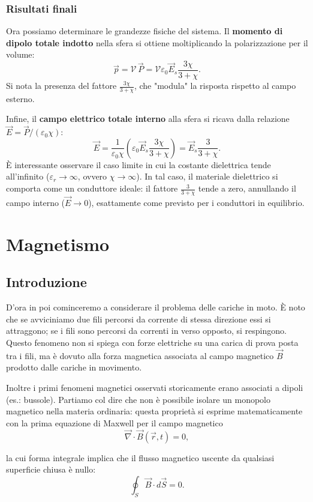 \documentclass{book}
\begin{document}
\subsection*{Risultati finali}
Ora possiamo determinare le grandezze fisiche del sistema.
Il \textbf{momento di dipolo totale indotto} nella sfera si ottiene moltiplicando la polarizzazione per il volume:
$$
\vec{p} = \mathcal{V}\,\vec{P} = \mathcal{V}\varepsilon_0\vec{E}_s\frac{3\chi}{3+\chi}.
$$
Si nota la presenza del fattore $\frac{3\chi}{3+\chi}$, che "modula" la risposta rispetto al campo esterno.

Infine, il \textbf{campo elettrico totale interno} alla sfera si ricava dalla relazione $\vec{E}=\vec{P}/(\varepsilon_0\chi)$:
$$
\vec{E}=\frac{1}{\varepsilon_0\chi}\left( \varepsilon_0\vec{E}_s\frac{3\chi}{3+\chi} \right) = \vec{E}_s\frac{3}{3+\chi}.
$$
È interessante osservare il caso limite in cui la costante dielettrica tende all'infinito ($\varepsilon_r \to \infty$, ovvero $\chi \to \infty$). In tal caso, il materiale dielettrico si comporta come un conduttore ideale: il fattore $\frac{3}{3+\chi}$ tende a zero, annullando il campo interno ($\vec{E} \to 0$), esattamente come previsto per i conduttori in equilibrio.

\chapter{Magnetismo}
\section{Introduzione}

D'ora in poi cominceremo a considerare il problema delle cariche in moto. \`E noto che se avviciniamo due fili percorsi da corrente di stessa direzione essi si attraggono; se i fili sono percorsi da correnti in verso opposto, si respingono. Questo fenomeno non si spiega con forze elettriche su una carica di prova posta tra i fili, ma \`e dovuto alla forza magnetica associata al campo magnetico $\vec B$ prodotto dalle cariche in movimento.

Inoltre i primi fenomeni magnetici osservati storicamente erano associati a dipoli (es.: bussole). Partiamo col dire che non \`e possibile isolare un monopolo magnetico nella materia ordinaria: questa propriet\`a si esprime matematicamente con la prima equazione di Maxwell per il campo magnetico
$$
\vec{\nabla}\cdot\vec B(\vec r,t)=0,
$$

la cui forma integrale implica che il flusso magnetico uscente da qualsiasi superficie chiusa \`e nullo:
$$
\oint_{S}\vec B\cdot d\vec S = 0.
$$
\end{document}

